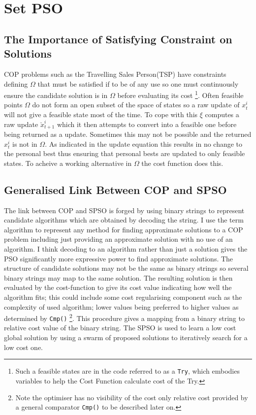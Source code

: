 \documentclass[a4paper,oneside,english]{book}
\numberwithin{equation}{section}
\numberwithin{figure}{section}
\begin{document}
   

\section{Set PSO}\label{Sec:SetPSO}

\subsection{The Importance of Satisfying Constraint on Solutions }
COP problems such as the Travelling Sales Person(TSP) have constraints defining $\varOmega$ that must be satisfied if to be of any use so one must continuously ensure the candidate solution is in $\varOmega$ before evaluating its cost \footnote{ Such a feasible states are in the code referred to as a \texttt{Try}, which embodies variables to help the Cost Function calculate cost of the Try. }.  Often feasible points $\varOmega$ do not form an open subset of the space of states so a raw update of $x_t^i$ will not give a feasible state most of the time. To cope with this $\xi$ computes a raw update $\breve{x}_{t+1}^i$ which it then attempts to  convert into a feasible one before being returned as a update. Sometimes this may not be possible and the returned $x_t^i$ is not in $\varOmega$. As indicated in the update equation this results in no change to the personal best thus ensuring that personal bests are updated to only feasible states.   To acheive a working alternative  in $\varOmega$ the  cost function does this. 

\subsection{Generalised Link Between COP and SPSO}
The link between COP and SPSO is forged by using binary strings to represent candidate algorithms which are obtained by decoding the string. I use the term algorithm to represent any method for finding approximate solutions to a COP problem including just providing an approximate solution with no use of an algorithm. I think decoding to an algorithm rather than just a solution gives the PSO significantly more expressive power to find approximate solutions. The structure of candidate solutions may not be the same as binary strings  so several binary strings may map to the same solution. The resulting solution is then evaluated by the cost-function to give its cost value indicating how well the algorithm fits; this could include some cost regularising component such as the complexity of used algorithm; lower values being preferred to higher values as determined by \texttt{Cmp()}  \footnote{ Note the optimiser has no visibility of the cost only relative cost provided by a general comparator \texttt{Cmp()} to be described later on. }. This procedure gives a mapping from a binary string to  relative cost value of the binary string. The SPSO is used to learn a low cost global solution by using a swarm of proposed solutions to iteratively search for a low cost one.
\end{document}
